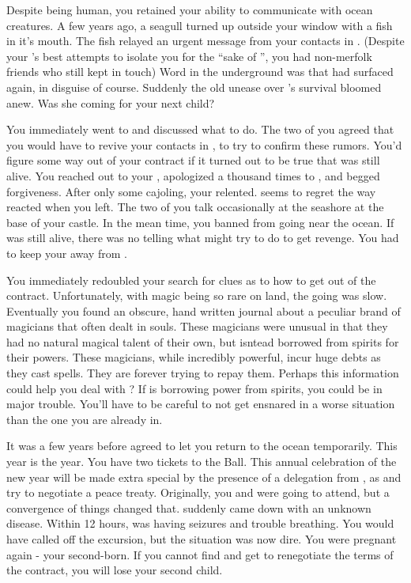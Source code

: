 \documentclass[char]{NeptuneBall}
\begin{document}
Despite being human, you retained your ability to communicate with ocean creatures. A few years ago, a seagull turned up outside your window with a fish in it's mouth. The fish relayed an urgent message from your contacts in \pAtlantis{}. (Despite your \cKing{\parent}'s best attempts to isolate you for the ``sake of \pAtlantis{}'', you had non-merfolk friends who still kept in touch) Word in the underground was that \cWitch{} had surfaced again, in disguise of course.  Suddenly the old unease over \cWitch{}'s survival bloomed anew. Was she coming for your next child? 

You immediately went to \cEric{} and discussed what to do. The two of you agreed that you would have to revive your contacts in \pAtlantis{}, to try to confirm these rumors. You'd figure some way out of your contract if it turned out to be true that \cWitch{} was still alive. You reached out to your \cKing{\parent}, apologized a thousand times to \cKing{\them}, and begged \cKing{\their} forgiveness. After only some cajoling, your \cKing{\parent} relented. \cKing{\They} seems to regret the way \cKing{\they} reacted when you left. The two of you talk occasionally at the seashore at the base of your castle.  In the mean time, you banned \cWillow{} from going near the ocean. If \cWitch{} was still alive, there was no telling what \cWitch{\they} might try to do to get revenge. You had to keep your \cWillow{\offspring} away from \cWitch{}.

You immediately redoubled your search for clues as to how to get out of the contract. Unfortunately, with magic being so rare on land, the going was slow. Eventually you found an obscure, hand written journal about a peculiar brand of magicians that often dealt in souls. These magicians were unusual in that they had no natural magical talent of their own, but isntead borrowed from spirits for their powers. These magicians, while incredibly powerful, incur huge debts as they cast spells. They are forever trying to repay them. Perhaps this information could help you deal with \cWitch{}? If \cWitch{} is borrowing power from spirits, you could be in major trouble. You'll have to be careful to not get ensnared in a worse situation than the one you are already in.

It was a few years before \cKing{\King} \cKing{} agreed to let you return to the ocean temporarily. This year is the year. You have two tickets to the \cExExKing{} Ball. This annual celebration of the new year will be made extra special by the presence of a delegation from \pPacifica{}, as \pAtlantis{} and \pPacifica{} try to negotiate a peace treaty. Originally, you and \cEric{} were going to attend, but a convergence of things changed that. \cEric{} suddenly came down with an unknown disease. Within 12 hours, \cEric{} was having seizures and trouble breathing. You would have called off the excursion, but the situation was now dire. You were pregnant again - your second-born. If you cannot find \cWitch{} and get \cWitch{\them} to renegotiate the terms of the contract, you will lose your second child.
\end{document}
